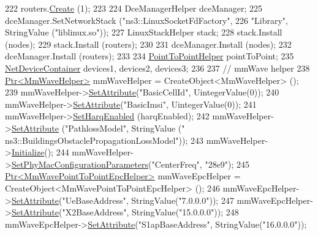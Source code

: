 \begin{DoxyCode}
{{{222   routers.\hyperlink{classns3_1_1NodeContainer_a787f059e2813e8b951cc6914d11dfe69}{Create} (1);
223 
224   DceManagerHelper dceManager;
225   dceManager.SetNetworkStack (\textcolor{stringliteral}{"ns3::LinuxSocketFdFactory"},
226                               \textcolor{stringliteral}{"Library"}, StringValue (\textcolor{stringliteral}{"liblinux.so"}));
227   LinuxStackHelper stack;
228   stack.Install (nodes);
229   stack.Install (routers);
230 
231   dceManager.Install (nodes);
232   dceManager.Install (routers);
233 
234   \hyperlink{classns3_1_1PointToPointHelper}{PointToPointHelper} pointToPoint;
235   \hyperlink{classns3_1_1NetDeviceContainer}{NetDeviceContainer} devices1, devices2, devices3;
236 
237   \textcolor{comment}{// mmWave helper}
238   \hyperlink{classns3_1_1Ptr}{Ptr<MmWaveHelper>} mmWaveHelper = CreateObject<MmWaveHelper> ();
239   mmWaveHelper->\hyperlink{classns3_1_1ObjectBase_ac60245d3ea4123bbc9b1d391f1f6592f}{SetAttribute}(\textcolor{stringliteral}{"BasicCellId"}, UintegerValue(0));
240   mmWaveHelper->\hyperlink{classns3_1_1ObjectBase_ac60245d3ea4123bbc9b1d391f1f6592f}{SetAttribute}(\textcolor{stringliteral}{"BasicImsi"}, UintegerValue(0));
241   mmWaveHelper->\hyperlink{classns3_1_1MmWaveHelper_af211a02952ab5f4eabe0219cf53e7e1c}{SetHarqEnabled} (harqEnabled);
242   mmWaveHelper->\hyperlink{classns3_1_1ObjectBase_ac60245d3ea4123bbc9b1d391f1f6592f}{SetAttribute} (\textcolor{stringliteral}{"PathlossModel"}, StringValue (\textcolor{stringliteral}{"
      ns3::BuildingsObstaclePropagationLossModel"}));
243   mmWaveHelper->\hyperlink{classns3_1_1Object_af4411cb29971772fcd09203474a95078}{Initialize}();
244   mmWaveHelper->\hyperlink{classns3_1_1MmWaveHelper_a32dc7803e0a5a5b556939aaf869c242d}{SetPhyMacConfigurationParameters}(\textcolor{stringliteral}{"CenterFreq"}, \textcolor{stringliteral}{"28e9"});
245   \hyperlink{classns3_1_1Ptr}{Ptr<MmWavePointToPointEpcHelper>} mmWaveEpcHelper = 
      CreateObject<MmWavePointToPointEpcHelper> ();
246   mmWaveEpcHelper->\hyperlink{classns3_1_1ObjectBase_ac60245d3ea4123bbc9b1d391f1f6592f}{SetAttribute}(\textcolor{stringliteral}{"UeBaseAddress"}, StringValue(\textcolor{stringliteral}{"7.0.0.0"}));
247   mmWaveEpcHelper->\hyperlink{classns3_1_1ObjectBase_ac60245d3ea4123bbc9b1d391f1f6592f}{SetAttribute}(\textcolor{stringliteral}{"X2BaseAddress"}, StringValue(\textcolor{stringliteral}{"15.0.0.0"}));
248   mmWaveEpcHelper->\hyperlink{classns3_1_1ObjectBase_ac60245d3ea4123bbc9b1d391f1f6592f}{SetAttribute}(\textcolor{stringliteral}{"S1apBaseAddress"}, StringValue(\textcolor{stringliteral}{"16.0.0.0"}));
}}}
\end{DoxyCode}
